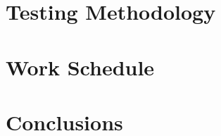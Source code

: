 \documentclass[runningheads]{llncs}
\begin{document}
\section{Testing Methodology}\label{sec:methodology}

\section{Work Schedule}\label{sec:workschedule}

\section{Conclusions}\label{sec:conclusion}



\end{document}

